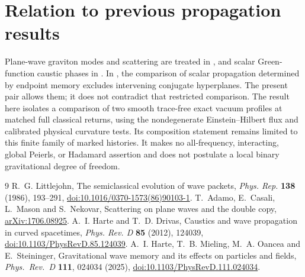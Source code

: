 \documentclass[11pt]{article}
\begin{document}
\section{Relation to previous propagation results}
Plane-wave graviton modes and scattering are treated in \cite{adamo}, and scalar Green-function caustic phases in \cite{drivas}. In \cite[Sec.~V.A]{harte}, the comparison of scalar propagation determined by endpoint memory excludes intervening conjugate hyperplanes. The present pair allows them; it does not contradict that restricted comparison. The result here isolates a comparison of two smooth trace-free exact vacuum profiles at matched full classical returns, using the nondegenerate Einstein--Hilbert flux and calibrated physical curvature tests. Its composition statement remains limited to this finite family of marked histories. It makes no all-frequency, interacting, global Peierls, or Hadamard assertion and does not postulate a local binary gravitational degree of freedom.

\begin{thebibliography}{9}
R.~G. Littlejohn, The semiclassical evolution of wave packets,
\emph{Phys. Rep.} \textbf{138} (1986), 193--291,
\href{https://doi.org/10.1016/0370-1573(86)90103-1}{doi:10.1016/0370-1573(86)90103-1}.
T.~Adamo, E.~Casali, L.~Mason and S.~Nekovar,
Scattering on plane waves and the double copy,
\href{https://arxiv.org/abs/1706.08925}{arXiv:1706.08925}.
A.~I. Harte and T.~D. Drivas,
Caustics and wave propagation in curved spacetimes,
\emph{Phys. Rev. D} \textbf{85} (2012), 124039,
\href{https://doi.org/10.1103/PhysRevD.85.124039}{doi:10.1103/PhysRevD.85.124039}.
A.~I. Harte, T.~B. Mieling, M.~A. Oancea and E.~Steininger,
Gravitational wave memory and its effects on particles and fields,
\emph{Phys.\ Rev.\ D} \textbf{111}, 024034 (2025), \href{https://doi.org/10.1103/PhysRevD.111.024034}{doi:10.1103/PhysRevD.111.024034}.
\end{thebibliography}
\end{document}
